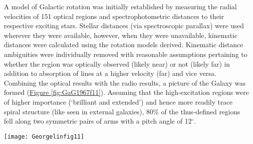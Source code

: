 		    A model of Galactic rotation was initially established by measuring the radial velocities of 151 optical \hii\space regions and spectrophotometric distances to their respective exciting stars. Stellar distances (via spectroscopic parallax) were used wherever they were available, however, when they were unavailable, kinematic distances were calculated using the rotation models derived. Kinematic distance ambiguities were individually removed with reasonable assumptions pertaining to whether the \hii\space region was optically observed (likely near) or not (likely far) in addition to absorption of lines at a higher velocity (far) and vice versa. Combining the optical results with the radio results, a picture of the Galaxy was formed (\hyperref[fig:GaG1967f11]{Figure \ref*{fig:GaG1967f11}}). Assuming that the high-excitation \hii\space regions were of higher importance (`brilliant and extended') and hence more readily trace spiral structure (like seen in external galaxies), 80\% of the thus-defined \hii\space regions fell along two symmetric pairs of arms with a pitch angle of 12$^\circ$.
            \begin{SCfigure}
            	\centering
            	\texttt{[image: Georgelinfig11]}
            	\caption[Georgelin and Georgelin 1976, Figure 11]{Figure 11 from \citet{Georgelin1976}. Original caption:\\ {\it Spiral model of our Galaxy obtained from high-excitation-parameter H{\textsc{ii}} regions ($U>70$ pc cm$^{-2}$); the resulting spiral pattern has two symmetric pairs of arms (i.e for altogether). No. 1 Major arm: {\em Sagittarius-Carina arm}; No. 2 Intermediate arm; {\em Scutum-Crux arm}; No. 1'. Internal arm: {\em Norma arm}; No 2'. External arm: {\em Perseus arm}. Hatched areas correspond to intensity maxima in the radio continuum and in neutral hydrogen.}}
            	\protect \label{fig:GaG1967f11}
            \end{SCfigure}
            
